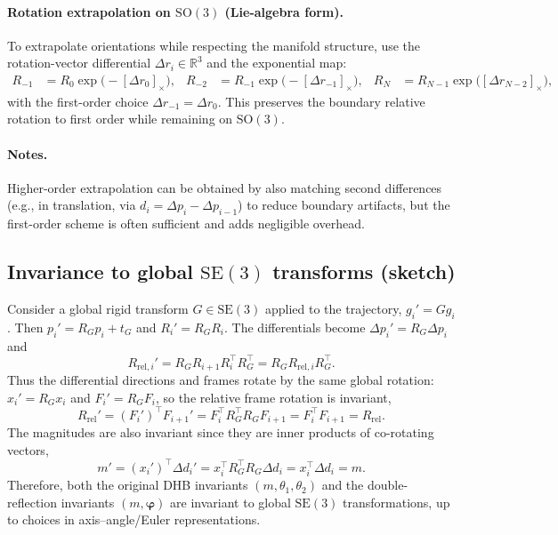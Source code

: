 \documentclass[11pt]{article}
\begin{document}
\paragraph{Rotation extrapolation on $\mathrm{SO}(3)$ (Lie-algebra form).}
To extrapolate orientations while respecting the manifold structure, use the rotation-vector differential $\Delta r_i \in \mathbb{R}^3$ and the exponential map:
\begin{align}
  R_{-1} &= R_0 \exp\bigl(-[\Delta r_0]_\times\bigr),
  & R_{-2} &= R_{-1} \exp\bigl(-[\Delta r_{-1}]_\times\bigr),
  & R_N &= R_{N-1} \exp\bigl([\Delta r_{N-2}]_\times\bigr),
\end{align}
with the first-order choice $\Delta r_{-1}=\Delta r_0$. This preserves the boundary relative rotation to first order while remaining on $\mathrm{SO}(3)$.

\paragraph{Notes.}
Higher-order extrapolation can be obtained by also matching second differences (e.g., in translation, via $d_i = \Delta p_i - \Delta p_{i-1}$) to reduce boundary artifacts, but the first-order scheme is often sufficient and adds negligible overhead.

\subsection{Invariance to global $\mathrm{SE}(3)$ transforms (sketch)}
Consider a global rigid transform $G \in \mathrm{SE}(3)$ applied to the trajectory, $g_i' = G g_i$. Then $p_i' = R_G p_i + t_G$ and $R_i' = R_G R_i$. The differentials become $\Delta p_i' = R_G \Delta p_i$ and
\begin{equation}
  R_{\mathrm{rel},i}' = R_G R_{i+1} R_i^\top R_G^\top = R_G R_{\mathrm{rel},i} R_G^\top.
\end{equation}
Thus the differential directions and frames rotate by the same global rotation: $x_i' = R_G x_i$ and $F_i' = R_G F_i$, so the relative frame rotation is invariant,
\begin{equation}
  R_{\mathrm{rel}}' = (F_i')^\top F_{i+1}' = F_i^\top R_G^\top R_G F_{i+1} = F_i^\top F_{i+1} = R_{\mathrm{rel}}.
\end{equation}
The magnitudes are also invariant since they are inner products of co-rotating vectors,
\begin{equation}
  m' = (x_i')^\top \Delta d_i' = x_i^\top R_G^\top R_G \Delta d_i = x_i^\top \Delta d_i = m.
\end{equation}
Therefore, both the original DHB invariants $(m,\theta_1,\theta_2)$ and the double-reflection invariants $(m,\bm{\varphi})$ are invariant to global $\mathrm{SE}(3)$ transformations, up to choices in axis--angle/Euler representations.
\end{document}
